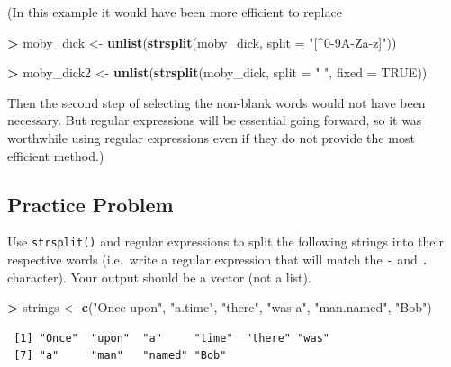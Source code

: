\documentclass[]{krantz}
\makeatletter
\newenvironment{Shaded}{\begin{snugshade}}{\end{snugshade}}
\newcommand{\KeywordTok}[1]{\textcolor[rgb]{0.27,0.27,0.27}{\textbf{#1}}}
\newcommand{\DataTypeTok}[1]{\textcolor[rgb]{0.27,0.27,0.27}{#1}}
\newcommand{\StringTok}[1]{\textcolor[rgb]{0.5,0.5,0.5}{#1}}
\newcommand{\OtherTok}[1]{\textcolor[rgb]{0.37,0.37,0.37}{#1}}
\newcommand{\OperatorTok}[1]{\textcolor[rgb]{0.43,0.43,0.43}{\textbf{#1}}}
\newcommand{\NormalTok}[1]{#1}
\newenvironment{kframe}{%
\medskip{}
\setlength{\fboxsep}{.8em}
 \def\at@end@of@kframe{}%
 \ifinner\ifhmode%
  \def\at@end@of@kframe{\end{minipage}}%
  \begin{minipage}{\columnwidth}%
 \fi\fi%
 \def\FrameCommand##1{\hskip\@totalleftmargin \hskip-\fboxsep
 \colorbox{shadecolor}{##1}\hskip-\fboxsep
     \hskip-\linewidth \hskip-\@totalleftmargin \hskip\columnwidth}%
 \MakeFramed {\advance\hsize-\width
   \@totalleftmargin\z@ \linewidth\hsize
   \@setminipage}}%
 {\par\unskip\endMakeFramed%
 \at@end@of@kframe}
\renewenvironment{Shaded}{\begin{kframe}}{\end{kframe}}
\makeatother
\begin{document}
(In this example it would have been more efficient to replace

\begin{Shaded}
\begin{Highlighting}[]
\OperatorTok{>}\StringTok{ }\NormalTok{moby_dick <-}\StringTok{ }\KeywordTok{unlist}\NormalTok{(}\KeywordTok{strsplit}\NormalTok{(moby_dick, }\DataTypeTok{split =} \StringTok{"[^0-9A-Za-z]"}\NormalTok{))}
\end{Highlighting}
\end{Shaded}

\begin{Shaded}
\begin{Highlighting}[]
\OperatorTok{>}\StringTok{ }\NormalTok{moby_dick2 <-}\StringTok{ }\KeywordTok{unlist}\NormalTok{(}\KeywordTok{strsplit}\NormalTok{(moby_dick, }\DataTypeTok{split =} \StringTok{" "}\NormalTok{, }\DataTypeTok{fixed =} \OtherTok{TRUE}\NormalTok{))}
\end{Highlighting}
\end{Shaded}

Then the second step of selecting the non-blank words would not have
been necessary. But regular expressions will be essential going forward,
so it was worthwhile using regular expressions even if they do not
provide the most efficient method.)

\subsection{Practice Problem}\label{practice-problem-14}

Use \texttt{strsplit()} and regular expressions to split the following
strings into their respective words (i.e.~write a regular expression
that will match the \texttt{-} and \texttt{.} character). Your output
should be a vector (not a list).

\begin{Shaded}
\begin{Highlighting}[]
\OperatorTok{>}\StringTok{ }\NormalTok{strings <-}\StringTok{ }\KeywordTok{c}\NormalTok{(}\StringTok{"Once-upon"}\NormalTok{, }\StringTok{"a.time"}\NormalTok{, }\StringTok{"there"}\NormalTok{, }\StringTok{"was-a"}\NormalTok{, }\StringTok{"man.named"}\NormalTok{, }\StringTok{"Bob"}\NormalTok{)}
\end{Highlighting}
\end{Shaded}

\begin{verbatim}
 [1] "Once"  "upon"  "a"     "time"  "there" "was"  
 [7] "a"     "man"   "named" "Bob"  
\end{verbatim}
\end{document}
